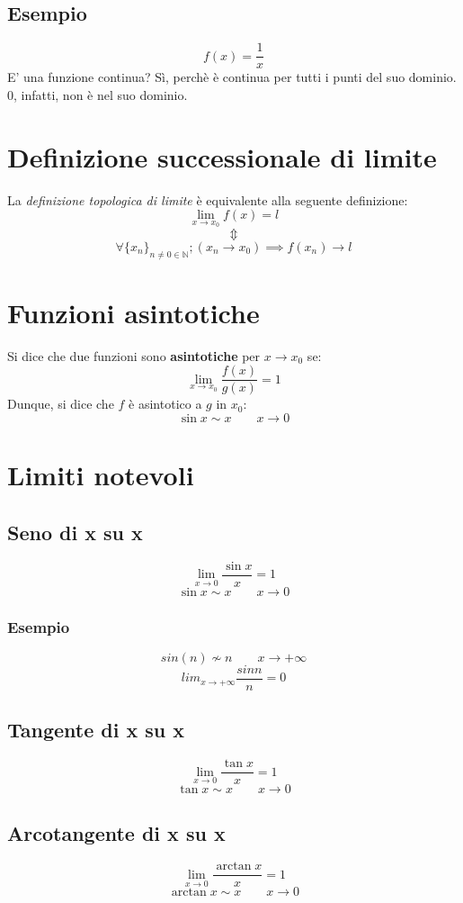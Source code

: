 \documentclass{article}
\begin{document}
\subsection{Esempio}
\[f(x) = \frac{1}{x}\]
E' una funzione continua? Sì, perchè è continua per tutti i punti del suo dominio. 0, infatti, non è nel suo dominio.

\section{Definizione successionale di limite}
La \textit{definizione topologica di limite} è equivalente alla seguente definizione:
\[\lim_{x \to x_0} f(x) = l\]
\[\Updownarrow\]
\[\forall \{x_n\}_{n \neq 0 \in \mathbb{N}}; (x_n \to x_0) \implies f(x_n) \to l\]

\section{Funzioni asintotiche}
Si dice che due funzioni sono \textbf{asintotiche} per \(x \to x_0\) se:
\[\lim_{x \to x_0} \frac{f(x)}{g(x)} = 1\]
Dunque, si dice che \(f\) è asintotico a \(g\) in \(x_0\):
\[\sin x \sim x \qquad x \to 0\]

\section{Limiti notevoli}
\subsection{Seno di x su x}
\[\lim_{x \to 0} \frac{\sin x}{x} = 1\]
\[\sin x \sim x \qquad x \to 0\]

\subsubsection{Esempio}
\[sin(n) \not\sim n \qquad x \to +\infty\]
\[lim_{x \to +\infty} \frac{sin n}{n} = 0\]

\subsection{Tangente di x su x}
\[\lim_{x \to 0} \frac{\tan x}{x} = 1\]
\[\tan x \sim x \qquad x \to 0\]

\subsection{Arcotangente di x su x}
\[\lim_{x \to 0} \frac{\arctan x}{x} = 1\]
\[\arctan x \sim x \qquad x \to 0\]
\end{document}
